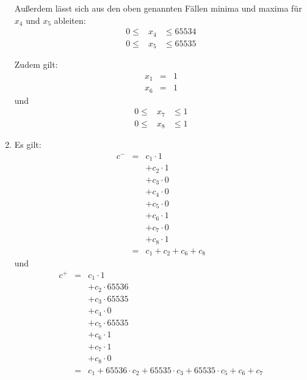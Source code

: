 \documentclass[DIN, pagenumber=false, fontsize=11pt, parskip=half]{scrartcl}
\begin{document}
\begin{enumerate}[label=\alph*)]
            Außerdem lässt sich aus den oben genannten Fällen minima und maxima für
            $x_4$ und $x_5$ ableiten:
            \begin{eqnarray}
                0 \leq &x_4& \leq 65534 \\
                0 \leq &x_5& \leq 65535
            \end{eqnarray}

            Zudem gilt:
            \begin{eqnarray}
                x_1 &=& 1 \\
                x_6 &=& 1
            \end{eqnarray}
            und
            \begin{eqnarray}
                0 \leq &x_7& \leq 1  \\ 
                0 \leq &x_8& \leq 1 
            \end{eqnarray}
        \item
            Es gilt:
            \begin{eqnarray}
                c^- &=& c_1 \cdot 1 \\
                    &&+ c_2 \cdot 1 \\ 
                    &&+ c_3 \cdot 0 \\
                    &&+ c_4 \cdot 0 \\  
                    &&+ c_5 \cdot 0 \\
                    &&+ c_6 \cdot 1 \\
                    &&+ c_7 \cdot 0 \\
                    &&+ c_8 \cdot 1 \\
                    &=& c_1 + c_2 + c_6 + c_8
            \end{eqnarray}
            und
            \begin{eqnarray}
                c^+ &=& c_1 \cdot 1 \\
                    &&+ c_2 \cdot 65536 \\ 
                    &&+ c_3 \cdot 65535 \\
                    &&+ c_4 \cdot 0 \\  
                    &&+ c_5 \cdot 65535 \\
                    &&+ c_6 \cdot 1 \\
                    &&+ c_7 \cdot 1 \\
                    &&+ c_8 \cdot 0 \\
                    &=& c_1 + 65536 \cdot c_2 + 65535 \cdot c_3 + 65535 \cdot c_5 + c_6 + c_7

\end{eqnarray}
\end{enumerate}
\end{document}
